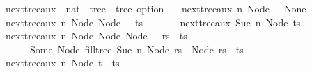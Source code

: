 \begin{isabellebox}
    \isamarkupfalse%
    \ next{\isacharunderscore}{\kern0pt}tree{\isacharunderscore}{\kern0pt}aux\ {\isacharcolon}{\kern0pt}{\isacharcolon}{\kern0pt}\ {\isachardoublequoteopen}nat\ {\isasymRightarrow}\ tree\ {\isasymRightarrow}\ tree\ option{\isachardoublequoteclose}\ \isanewline
    \ \ {\isachardoublequoteopen}next{\isacharunderscore}{\kern0pt}tree{\isacharunderscore}{\kern0pt}aux\ n\ {\isacharparenleft}{\kern0pt}Node\ {\isacharbrackleft}{\kern0pt}{\isacharbrackright}{\kern0pt}{\isacharparenright}{\kern0pt}\ {\isacharequal}{\kern0pt}\ None{\isachardoublequoteclose}\isanewline
    {\isacharbar}{\kern0pt}\ {\isachardoublequoteopen}next{\isacharunderscore}{\kern0pt}tree{\isacharunderscore}{\kern0pt}aux\ n\ {\isacharparenleft}{\kern0pt}Node\ {\isacharparenleft}{\kern0pt}Node\ {\isacharbrackleft}{\kern0pt}{\isacharbrackright}{\kern0pt}\ {\isacharhash}{\kern0pt}\ ts{\isacharparenright}{\kern0pt}{\isacharparenright}{\kern0pt}\ {\isacharequal}{\kern0pt}\isanewline
    \ \ \ \ \ \ next{\isacharunderscore}{\kern0pt}tree{\isacharunderscore}{\kern0pt}aux\ {\isacharparenleft}{\kern0pt}Suc\ n{\isacharparenright}{\kern0pt}\ {\isacharparenleft}{\kern0pt}Node\ ts{\isacharparenright}{\kern0pt}{\isachardoublequoteclose}\isanewline
    {\isacharbar}{\kern0pt}\ {\isachardoublequoteopen}next{\isacharunderscore}{\kern0pt}tree{\isacharunderscore}{\kern0pt}aux\ n\ {\isacharparenleft}{\kern0pt}Node\ {\isacharparenleft}{\kern0pt}Node\ {\isacharparenleft}{\kern0pt}Node\ {\isacharbrackleft}{\kern0pt}{\isacharbrackright}{\kern0pt}\ {\isacharhash}{\kern0pt}\ rs{\isacharparenright}{\kern0pt}\ {\isacharhash}{\kern0pt}\ ts{\isacharparenright}{\kern0pt}{\isacharparenright}{\kern0pt}\ {\isacharequal}{\kern0pt}\isanewline
    \ \ \ \ \ \ Some\ {\isacharparenleft}{\kern0pt}Node\ {\isacharparenleft}{\kern0pt}fill{\isacharunderscore}{\kern0pt}tree\ {\isacharparenleft}{\kern0pt}Suc\ n{\isacharparenright}{\kern0pt}\ {\isacharparenleft}{\kern0pt}Node\ rs{\isacharparenright}{\kern0pt}\ {\isacharat}{\kern0pt}\ {\isacharparenleft}{\kern0pt}Node\ rs{\isacharparenright}{\kern0pt}\ {\isacharhash}{\kern0pt}\ ts{\isacharparenright}{\kern0pt}{\isacharparenright}{\kern0pt}{\isachardoublequoteclose}\isanewline
    {\isacharbar}{\kern0pt}\ {\isachardoublequoteopen}next{\isacharunderscore}{\kern0pt}tree{\isacharunderscore}{\kern0pt}aux\ n\ {\isacharparenleft}{\kern0pt}Node\ {\isacharparenleft}{\kern0pt}t\ {\isacharhash}{\kern0pt}\ ts{\isacharparenright}{\kern0pt}{\isacharparenright}{\kern0pt}\ {\isacharequal}{\kern0pt}\isanewline

\end{isabellebox}
